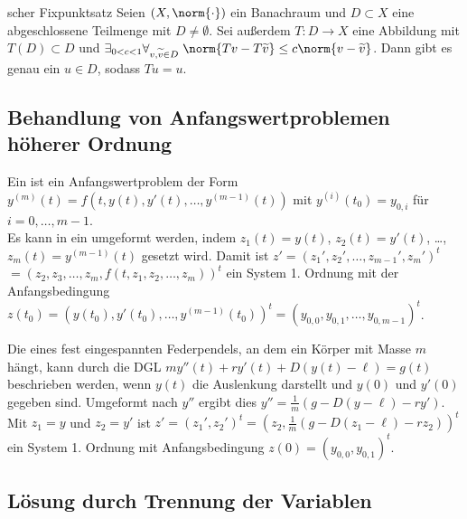 \begin{Satz}{scher Fixpunktsatz}
    Seien $(X, \norm{\cdot})$ ein Banachraum und
    $D \subset X$ eine abgeschlossene Teilmenge mit $D \not= \emptyset$.
    Sei außerdem $T\colon D \rightarrow X$ eine Abbildung mit
    $T(D) \subset D$ und
    $\exists_{0 < c < 1} \forall_{v, \widetilde{v} \in D}\;
    \norm{Tv - T\widetilde{v}} \le c \norm{v - \widetilde{v}}$.
    Dann gibt es genau ein $u \in D$, sodass $Tu = u$.
\end{Satz}

\subsection{%
    Behandlung von Anfangswertproblemen höherer Ordnung%
}

\begin{Bem}
    Ein  ist ein Anfangswertproblem
    der Form $y^{(m)}(t) = f(t, y(t), y'(t), \dotsc, y^{(m-1)}(t))$ mit
    $y^{(i)}(t_0) = y_{0,i}$ für $i = 0, \dotsc, m - 1$.\\
    Es kann in ein  umgeformt werden, indem
    $z_1(t) = y(t)$, $z_2(t) = y'(t)$, \dots, $z_m(t) = y^{(m-1)}(t)$ gesetzt
    wird.
    Damit ist $z' = (z_1', z_2', \dotsc, z_{m-1}', z_m')^t$\\
    $= (z_2, z_3, \dotsc, z_m, f(t, z_1, z_2, \dotsc, z_m))^t$
    ein System 1. Ordnung mit der Anfangsbedingung\\
    $z(t_0) = (y(t_0), y'(t_0), \dotsc, y^{(m-1)}(t_0))^t =
    (y_{0,0}, y_{0,1}, \dotsc, y_{0,m-1})^t$.
\end{Bem}

\begin{Bsp}
    Die  eines fest eingespannten
    Federpendels, an dem ein Körper mit Masse $m$ hängt, kann durch die DGL
    $m y''(t) + r y'(t) + D(y(t) - \ell) = g(t)$ beschrieben werden,
    wenn $y(t)$ die Auslenkung darstellt und $y(0)$ und $y'(0)$ gegeben sind.
    Umgeformt nach $y''$ ergibt dies
    $y'' = \frac{1}{m} (g - D(y - \ell) - ry')$.
    Mit $z_1 = y$ und $z_2 = y'$ ist
    $z' = (z_1', z_2')^t = (z_2, \frac{1}{m} (g - D(z_1 - \ell) - r z_2))^t$
    ein System 1. Ordnung mit Anfangsbedingung
    $z(0) = (y_{0,0}, y_{0,1})^t$.
\end{Bsp}

\subsection{%
    Lösung durch Trennung der Variablen%
}

